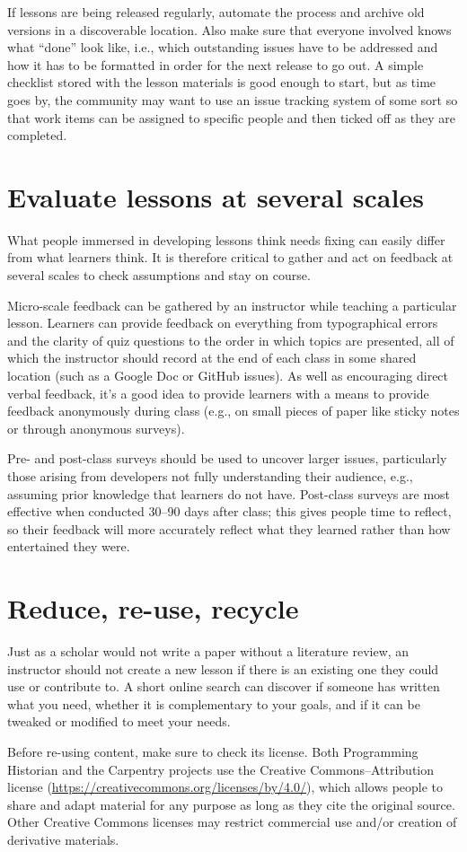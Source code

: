 \documentclass[10pt,letterpaper]{article}
\newcommand{\rulemajor}[2]{\section{#1}\label{#2}}
\begin{document}
If lessons are being released regularly,
automate the process
and archive old versions in a discoverable location.
Also make sure that everyone involved knows what ``done'' look like,
i.e.,
which outstanding issues have to be addressed
and how it has to be formatted
in order for the next release to go out.
A simple checklist stored with the lesson materials is good enough to start,
but as time goes by,
the community may want to use an issue tracking system of some sort
so that work items can be assigned to specific people
and then ticked off as they are completed.

\rulemajor{Evaluate lessons at several scales}{evaluate}

What people immersed in developing lessons think needs fixing
can easily differ from what learners think.
It is therefore critical to gather and act on feedback at several scales
to check assumptions and stay on course.

Micro-scale feedback can be gathered by an instructor while teaching a particular lesson.
Learners can provide feedback on everything from typographical errors
and the clarity of quiz questions
to the order in which topics are presented,
all of which the instructor should record at the end of each class
in some shared location (such as a Google Doc or GitHub issues).
As well as encouraging direct verbal feedback,
it's a good idea to provide learners with a means to provide feedback anonymously during class
(e.g., on small pieces of paper like sticky notes or through anonymous surveys).

Pre- and post-class surveys should be used to uncover larger issues,
particularly those arising from developers not fully understanding their audience,
e.g.,
assuming prior knowledge that learners do not have.
Post-class surveys are most effective when conducted 30--90 days after class;
this gives people time to reflect,
so their feedback will more accurately reflect what they learned
rather than how entertained they were.

\rulemajor{Reduce, re-use, recycle}{rrr}

Just as a scholar would not write a paper without a literature review,
an instructor should not create a new lesson if there is an existing one they could use or contribute to.
A short online search can discover if someone has written what you need,
whether it is complementary to your goals,
and if it can be tweaked or modified to meet your needs.

Before re-using content,
make sure to check its license.
Both Programming Historian and the Carpentry projects
use the Creative Commons--Attribution license
(\url{https://creativecommons.org/licenses/by/4.0/}),
which allows people to share and adapt material for any purpose
as long as they cite the original source.
Other Creative Commons licenses may restrict commercial use
and/or creation of derivative materials.
\end{document}
